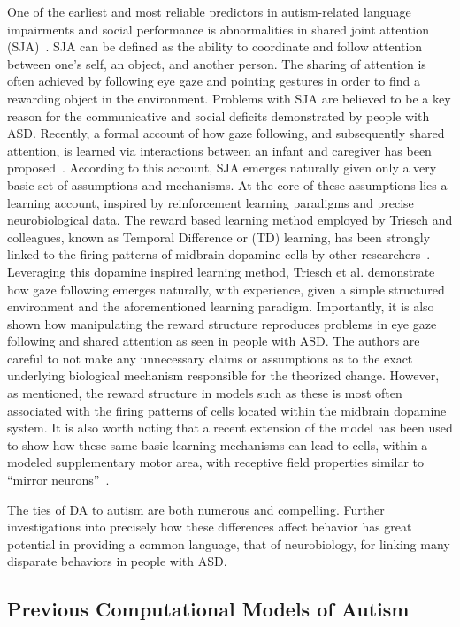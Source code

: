 \documentclass[man]{apa}
\begin{document}
One of the earliest and most reliable predictors in autism-related language impairments and social performance is abnormalities in shared joint attention (SJA)~\cite{RefWorks:163}. SJA can be defined as the ability to coordinate and follow attention between one's self, an object, and another person. The sharing of attention is often achieved by following eye gaze and pointing gestures in order to find a rewarding object in the environment. Problems with SJA are believed to be a key reason for the communicative and social deficits demonstrated by people with ASD. Recently, a formal account of how gaze following, and subsequently shared attention, is learned via interactions between an infant and caregiver has been proposed~\cite{RefWorks:77}. According to this account, SJA emerges naturally given only a very basic set of assumptions and mechanisms. At the core of these assumptions lies a learning account, inspired by reinforcement learning paradigms and precise neurobiological data. The reward based learning method employed by Triesch and colleagues, known as Temporal Difference or (TD) learning, has been strongly linked to the firing patterns of midbrain dopamine cells by other researchers~\cite{BartoAG:1994:TDLearning,MontaguePR:1996:Dopamine}. Leveraging this dopamine inspired learning method, Triesch et al. demonstrate how gaze following emerges naturally, with experience, given a simple structured environment and the aforementioned learning paradigm. Importantly, it is also shown how manipulating the reward structure reproduces problems in eye gaze following and shared attention as seen in people with ASD. The authors are careful to not make any unnecessary claims or assumptions as to the exact underlying biological  mechanism responsible for the theorized change.  However, as mentioned, the reward structure in models such as these is most often associated with the firing patterns of cells located within the midbrain dopamine system.  It is also worth noting that a recent extension of the model has been used to show how these same basic learning mechanisms can lead to cells, within a modeled supplementary motor area, with receptive field properties similar to ``mirror neurons''~\cite{RefWorks:91}.  

The ties of DA to autism are both numerous and compelling.  Further investigations into precisely how these differences affect behavior has great potential in providing a common language, that of neurobiology, for linking many disparate behaviors in people with ASD.


\subsection{Previous Computational Models of Autism}
\end{document}

